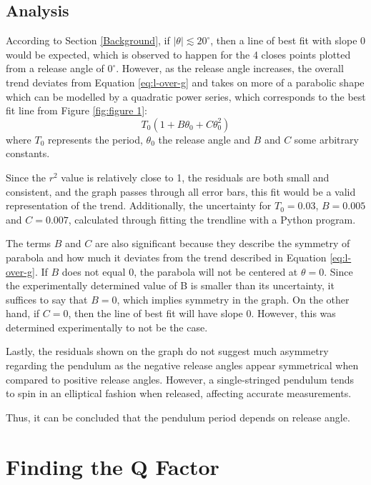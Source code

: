 \documentclass[12pt]{article}
\begin{document}
\subsection{Analysis}
According to Section \ref{Background}, {\color{blue} if $|\theta| \lesssim 20^{\circ}$, then a line of best fit with slope 0 would be expected, which is observed to happen for the 4 closes points plotted from a release angle of $0^\circ$. However, as the release angle increases, the overall trend deviates from Equation \ref{eq:l-over-g} and takes on more of a parabolic shape which can be modelled by a quadratic power series, which corresponds to the best fit line from Figure \ref{fig:figure 1}:}
\begin{equation} \label{eq:power series}
    T_0(1 + B\theta_0 + C\theta_0^2)
\end{equation}
where $T_0$ represents the period, $\theta_0$ the release angle and $B$ and $C$ some arbitrary constants. {\color{blue}Since the $r^2$ value is relatively close to 1, the residuals are both small and consistent, and the graph passes through all error bars, this fit would be a valid representation of the trend. Additionally, the uncertainty for $T_0 = 0.03$, $B = 0.005$ and $C = 0.007$, calculated through fitting the trendline with a Python program.

The terms $B$ and $C$ are also significant because they describe the symmetry of parabola and how much it deviates from the trend described in Equation \ref{eq:l-over-g}. If $B$ does not equal 0, the parabola will not be centered at $\theta = 0$. Since the experimentally determined value of B is smaller than its uncertainty, it suffices to say that $B = 0$, which implies symmetry in the graph. On the other hand, if $C = 0$, then the line of best fit will have slope 0. However, this was determined experimentally to not be the case.


Lastly, the residuals shown on the graph do not suggest much asymmetry regarding the pendulum as the negative release angles appear symmetrical when compared to positive release angles. However, a single-stringed pendulum tends to spin in an elliptical fashion when released, affecting accurate measurements.

Thus, it can be concluded that the pendulum period depends on release angle.}

\newpage

\section{Finding the Q Factor} \label{Finding the Q Factor}
\end{document}
